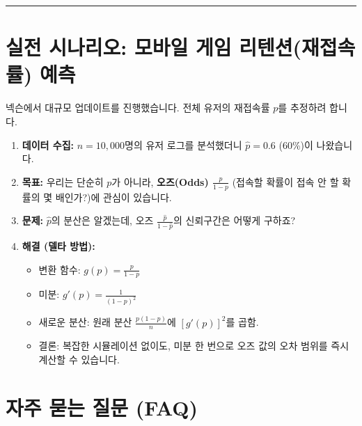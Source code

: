 \documentclass[11pt,a4paper]{book}
\theoremstyle{definition}
\begin{document}
\vspace{0.5cm}\hrule\vspace{0.5cm}

\section{실전 시나리오: 모바일 게임 리텐션(재접속률) 예측}

\begin{storybox}[title={Scenario: 대규모 업데이트의 성패}]
넥슨에서 대규모 업데이트를 진행했습니다. 전체 유저의 재접속률 $p$를 추정하려 합니다.
\end{storybox}

\begin{enumerate}
    \item \textbf{데이터 수집:} $n=10,000$명의 유저 로그를 분석했더니 $\hat{p} = 0.6$ (60\%)이 나왔습니다.
    \item \textbf{목표:} 우리는 단순히 $p$가 아니라, \textbf{오즈(Odds) $\frac{p}{1-p}$} (접속할 확률이 접속 안 할 확률의 몇 배인가?)에 관심이 있습니다.
    \item \textbf{문제:} $\hat{p}$의 분산은 알겠는데, 오즈 $\frac{\hat{p}}{1-\hat{p}}$의 신뢰구간은 어떻게 구하죠?
    \item \textbf{해결 (델타 방법):}
    \begin{itemize}
        \item 변환 함수: $g(p) = \frac{p}{1-p}$
        \item 미분: $g'(p) = \frac{1}{(1-p)^2}$
        \item 새로운 분산: 원래 분산 $\frac{p(1-p)}{n}$에 $[g'(p)]^2$를 곱함.
        \item 결론: 복잡한 시뮬레이션 없이도, 미분 한 번으로 오즈 값의 오차 범위를 즉시 계산할 수 있습니다.
    \end{itemize}
\end{enumerate}

\section{자주 묻는 질문 (FAQ)}
\end{document}

